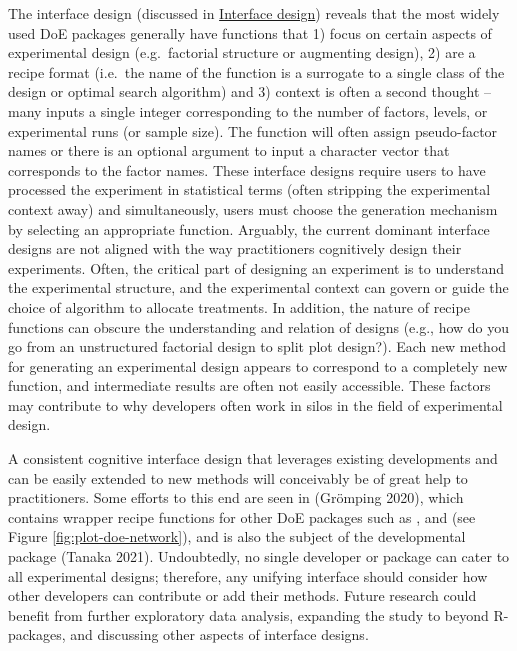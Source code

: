 The interface design (discussed in \hyperref[design]{Interface design}) reveals that the most widely used DoE packages generally have functions that 1) focus on certain aspects of experimental design (e.g.~factorial structure or augmenting design), 2) are a recipe format (i.e.~the name of the function is a surrogate to a single class of the design or optimal search algorithm) and 3) context is often a second thought -- many inputs a single integer corresponding to the number of factors, levels, or experimental runs (or sample size). The function will often assign pseudo-factor names or there is an optional argument to input a character vector that corresponds to the factor names. These interface designs require users to have processed the experiment in statistical terms (often stripping the experimental context away) and simultaneously, users must choose the generation mechanism by selecting an appropriate function. Arguably, the current dominant interface designs are not aligned with the way practitioners cognitively design their experiments. Often, the critical part of designing an experiment is to understand the experimental structure, and the experimental context can govern or guide the choice of algorithm to allocate treatments. In addition, the nature of recipe functions can obscure the understanding and relation of designs (e.g., how do you go from an unstructured factorial design to split plot design?). Each new method for generating an experimental design appears to correspond to a completely new function, and intermediate results are often not easily accessible. These factors may contribute to why developers often work in silos in the field of experimental design.

A consistent cognitive interface design that leverages existing developments and can be easily extended to new methods will conceivably be of great help to practitioners. Some efforts to this end are seen in  (Grömping 2020), which contains wrapper recipe functions for other DoE packages such as ,  and  (see Figure \ref{fig:plot-doe-network}), and is also the subject of the developmental package  (Tanaka 2021). Undoubtedly, no single developer or package can cater to all experimental designs; therefore, any unifying interface should consider how other developers can contribute or add their methods. Future research could benefit from further exploratory data analysis, expanding the study to beyond R-packages, and discussing other aspects of interface designs.

